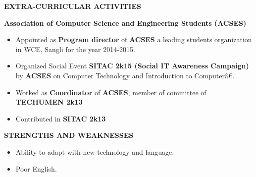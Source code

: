 \documentclass{article}
\begin{document}
\begin{minipage}{\textwidth}
	
\begin{framed}
	\large{\textbf{EXTRA-CURRICULAR ACTIVITIES}}
\end{framed}

\textbf{\setlength{\parindent}{20pt}\indent Association of Computer Science and Engineering Students (ACSES)}
\begin{itemize}
	\itemsep1pt \parskip0pt 
	\setlength{\itemsep}{0.1cm}%
	\setlength{\parskip}{0.2cm}%
	\setlength{\parsep}{0.2cm}%
	\item Appointed as \textbf{Program director} of \textbf{ACSES} a leading students organization in WCE, Sangli for the year 2014-2015.
	\item Organized Social Event \textbf{SITAC 2k15 (Social IT Awareness Campaign)} by \textbf{ACSES} on Computer Technology and Introduction to Computerâ€.
	\item Worked as \textbf{Coordinator} of \textbf{ACSES}, member of committee of \textbf{TECHUMEN 2k13}
	\item Contributed in \textbf{SITAC 2k13}
	
\end{itemize}

\end{minipage}

\vspace{1cm}

\begin{minipage}{\textwidth}
	\begin{framed}
		\large{\textbf{STRENGTHS AND WEAKNESSES}}
	\end{framed}
	\begin{itemize}
		\item Ability to adapt with new technology and language.
		\item Poor English.
	\end{itemize}		
\end{minipage}



\begin{comment}

\begin{framed}
	\large{\textbf{HOBBIES}}
\end{framed}
\begin{itemize}
	\item Coding
	\item Learning New Technologies.
	\item Daily Workout.
	\item Listening Songs.
\end{itemize}


\end{comment}
\vspace{1cm}
\end{document}
